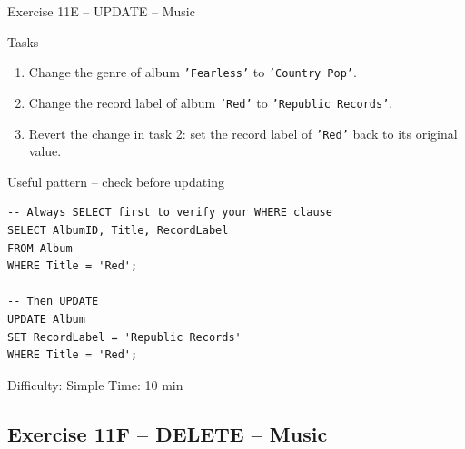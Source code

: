 \documentclass[10pt]{beamer}
\begin{document}
\begin{frame}[fragile]{Exercise 11E -- UPDATE -- Music}
  \begin{block}{Tasks}
    \begin{enumerate}
      \item Change the genre of album \texttt{'Fearless'} to \texttt{'Country Pop'}.
      \item Change the record label of album \texttt{'Red'} to \texttt{'Republic Records'}.
      \item Revert the change in task 2: set the record label of \texttt{'Red'} back to its original value.
    \end{enumerate}
  \end{block}

  \begin{block}{Useful pattern -- check before updating}
\begin{lstlisting}[style=sqlstyle]
-- Always SELECT first to verify your WHERE clause
SELECT AlbumID, Title, RecordLabel
FROM Album
WHERE Title = 'Red';

-- Then UPDATE
UPDATE Album
SET RecordLabel = 'Republic Records'
WHERE Title = 'Red';
\end{lstlisting}
  \end{block}

  \begin{alertblock}{Difficulty: Simple \quad Time: 10 min}
  \end{alertblock}
\end{frame}

\subsection{Exercise 11F -- DELETE -- Music}
\end{document}
